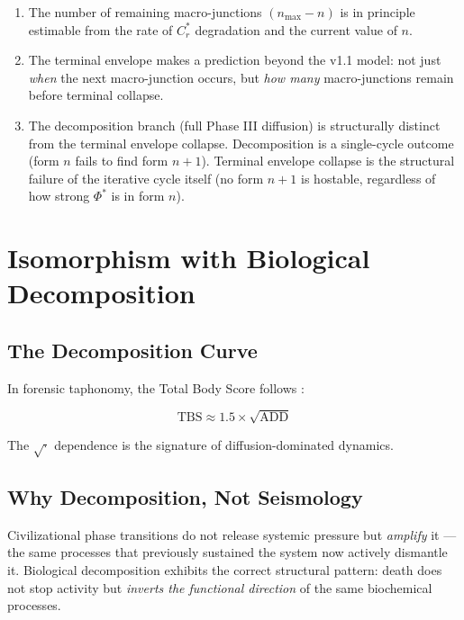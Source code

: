 \documentclass[12pt,a4paper]{article}
\newcommand{\reagmeta}{C_r^{*}}
\newcommand{\Phistar}{\Phi^{*}}
\newcommand{\nmax}{n_{\mathrm{max}}}
\begin{document}
\begin{enumerate}[label=(\roman*)]
    \item The number of remaining macro-junctions $(\nmax - n)$ is in principle estimable from the rate of $\reagmeta$ degradation and the current value of $n$.
    \item The terminal envelope makes a prediction beyond the v1.1 model: not just \emph{when} the next macro-junction occurs, but \emph{how many} macro-junctions remain before terminal collapse.
    \item The decomposition branch (full Phase III diffusion) is structurally distinct from the terminal envelope collapse. Decomposition is a single-cycle outcome (form $n$ fails to find form $n+1$). Terminal envelope collapse is the structural failure of the iterative cycle itself (no form $n+1$ is hostable, regardless of how strong $\Phistar$ is in form $n$).
\end{enumerate}


\section{Isomorphism with Biological Decomposition}\label{sec:decomposition}

\subsection{The Decomposition Curve}

In forensic taphonomy, the Total Body Score follows \cite{tbs_megyesi}:

\begin{equation}\label{eq:tbs}
\mathrm{TBS} \approx 1.5 \times \sqrt{\mathrm{ADD}}
\end{equation}

The $\sqrt{\cdot}$ dependence is the signature of diffusion-dominated dynamics.

\subsection{Why Decomposition, Not Seismology}

Civilizational phase transitions do not release systemic pressure but \emph{amplify} it --- the same processes that previously sustained the system now actively dismantle it. Biological decomposition exhibits the correct structural pattern: death does not stop activity but \emph{inverts the functional direction} of the same biochemical processes.
\end{document}
